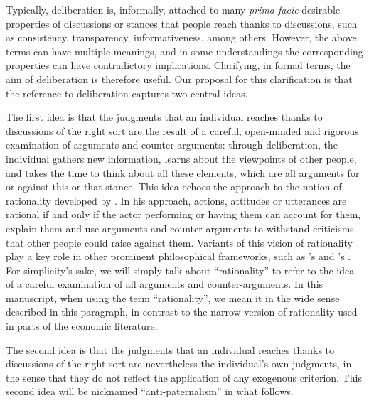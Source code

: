 \documentclass[version=3.21, pagesize, twoside=off, bibliography=totoc, DIV=calc, fontsize=12pt, a4paper, french, english]{scrartcl}
\begin{document}
Typically, deliberation is, informally, attached to many \emph{prima facie} desirable properties of discussions or stances that people reach thanks to discussions, such as consistency, transparency, informativeness, among others. However, the above terms can have multiple meanings, and in some understandings the corresponding properties can have contradictory implications. Clarifying, in formal terms, the aim of deliberation is therefore useful. Our proposal for this clarification is that the reference to deliberation captures two central ideas.

The first idea is that the judgments that an individual reaches thanks to discussions of the right sort are the result of a careful, open-minded and rigorous examination of arguments and counter-arguments: through deliberation, the individual gathers new information, learns about the viewpoints of other people, and takes the time to think about all these elements, 
which are all arguments for or against this or that stance. 
This idea echoes the approach to the notion of rationality developed by \citet{habermas_theorie_1981}.
In his approach, actions, attitudes or utterances are rational if and only if the actor performing or having them can account for them, explain them and use arguments and counter-arguments to withstand criticisms that other people could raise against them. 
Variants of this vision of rationality play a key role in other prominent philosophical frameworks, such as \citeauthor{scanlon_what_2000}’s \citeyearpar{scanlon_what_2000} and \citeauthor{sen_idea_2009}’s \citeyearpar{sen_idea_2009}. 
For simplicity’s sake, we will simply talk about “rationality” to refer to the idea of a careful examination of all arguments and counter-arguments.
In this manuscript, when using the term “rationality”, we mean it in the wide sense described in this paragraph, in contrast to the narrow version of rationality used in parts of the economic literature.

The second idea is that the judgments that an individual reaches thanks to discussions of the right sort are nevertheless the individual’s own judgments, in the sense that they do not reflect the application of any exogenous criterion. 
This second idea will be nicknamed “anti-paternalism” in what follows.
\end{document}
